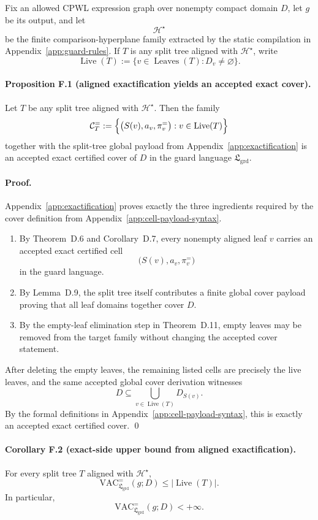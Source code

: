 Fix an allowed CPWL expression graph over nonempty compact domain $D$, let $g$ be its output, and let
\[
\mathcal H^\star
\]
be the finite comparison-hyperplane family extracted by the static compilation in Appendix~\ref{app:guard-rules}. If $T$ is any split tree aligned with $\mathcal H^\star$, write
\[
\operatorname{Live}(T)
:=
\{v\in\operatorname{Leaves}(T): D_v\neq\varnothing\}.
\]

\paragraph{Proposition F.1 (aligned exactification yields an accepted exact cover).}
Let $T$ be any split tree aligned with $\mathcal H^\star$. Then the family
\[
\mathcal C_T^{=}
:=
\Bigl\{\bigl(S(v),a_v,\pi_v^{=}\bigr): v\in\operatorname{Live}(T)\Bigr\}
\]
together with the split-tree global payload from Appendix~\ref{app:exactification} is an accepted exact certified cover of $D$ in the guard language $\mathfrak L_{\mathrm{grd}}$.

\paragraph{Proof.}
Appendix~\ref{app:exactification} proves exactly the three ingredients required by the cover definition from Appendix~\ref{app:cell-payload-syntax}.
\begin{enumerate}
    \item By Theorem~D.6 and Corollary~D.7, every nonempty aligned leaf $v$ carries an accepted exact certified cell
    \[
    \bigl(S(v),a_v,\pi_v^{=}\bigr)
    \]
    in the guard language.
    \item By Lemma~D.9, the split tree itself contributes a finite global cover payload proving that all leaf domains together cover $D$.
    \item By the empty-leaf elimination step in Theorem~D.11, empty leaves may be removed from the target family without changing the accepted cover statement.
\end{enumerate}
After deleting the empty leaves, the remaining listed cells are precisely the live leaves, and the same accepted global cover derivation witnesses
\[
D\subseteq \bigcup_{v\in\operatorname{Live}(T)} D_{S(v)}.
\]
By the formal definitions in Appendix~\ref{app:cell-payload-syntax}, this is exactly an accepted exact certified cover. \qed

\paragraph{Corollary F.2 (exact-side upper bound from aligned exactification).}
For every split tree $T$ aligned with $\mathcal H^\star$,
\[
\mathrm{VAC}^{=}_{\mathfrak L_{\mathrm{grd}}}(g;D)
\le
|\operatorname{Live}(T)|.
\]
In particular,
\[
\mathrm{VAC}^{=}_{\mathfrak L_{\mathrm{grd}}}(g;D)<+\infty.
\]


